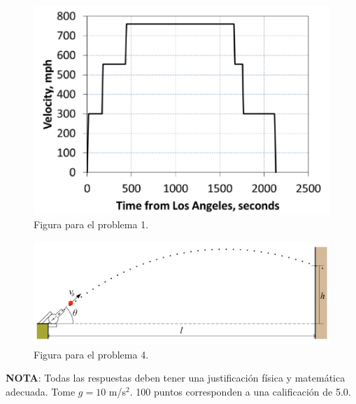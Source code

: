 \documentclass[letterpaper,10pt,onecolumn]{article}
\begin{document}
\begin{figure}[!h]
\begin{center}
\includegraphics[scale=0.40]{figs/hyperloop.png}
\caption{Figura para el problema 1. \label{loop}}
\end{center}
\end{figure}

\begin{figure}[!h]
\begin{center}
\includegraphics[scale=0.27]{figs/proyectil.png}
\caption{Figura para el problema 4. \label{proyectil}}
\end{center}
\end{figure}

{\bf NOTA}: Todas las respuestas deben tener una justificaci\'on
f\'isica y matem\'atica adecuada. Tome $g=10$ m/s$^{2}$. 100 puntos
corresponden a una calificaci\'on de 5.0.
\end{document}
